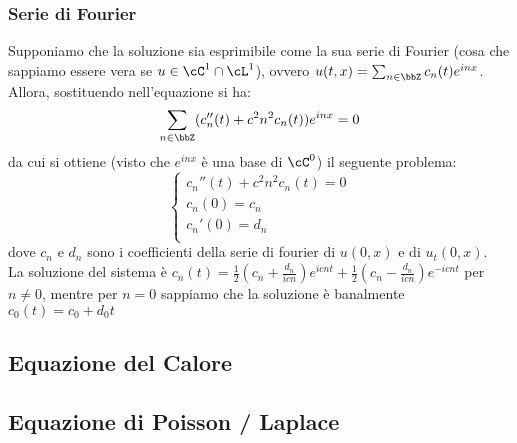 \documentclass[a4paper,NoNotes,GeneralMath]{stdmdoc}
\begin{document}
	\subsubsection*{Serie di Fourier}
	Supponiamo che la soluzione sia esprimibile come la sua serie di Fourier (cosa che sappiamo essere vera se $u \in \cC^1 \cap \cL^1$), ovvero $u(t, x) = \sum_{n \in \bbZ} c_n(t) e^{inx}$. Allora, sostituendo nell'equazione si ha:
	$$ \sum_{n \in \bbZ} (c_n''(t) + c^2 n^2 c_n(t)) e^{inx} = 0 $$
	da cui si ottiene (visto che $e^{inx}$ è una base di $\cC^0$) il seguente problema:
	$$ \left\{ \begin{array}{c} c_n''(t) + c^2 n^2 c_n(t) = 0 \\ c_n(0) = c_n \\ c_n'(0) = d_n \\ \end{array} \right. $$
	dove $c_n$ e $d_n$ sono i coefficienti della serie di fourier di $u(0, x)$ e di $u_t(0, x)$. \\
	La soluzione del sistema è $c_n(t)  = \frac{1}{2} (c_n + \frac{d_n}{icn}) e^{icnt} + \frac{1}{2} (c_n - \frac{d_n}{icn}) e^{-icnt}$ per $n \neq 0$, mentre per $n = 0$ sappiamo che la soluzione è banalmente $c_0(t) = c_0 + d_0 t$
	
	\subsection*{Equazione del Calore}
	\subsection*{Equazione di Poisson / Laplace}
	
\end{document}
